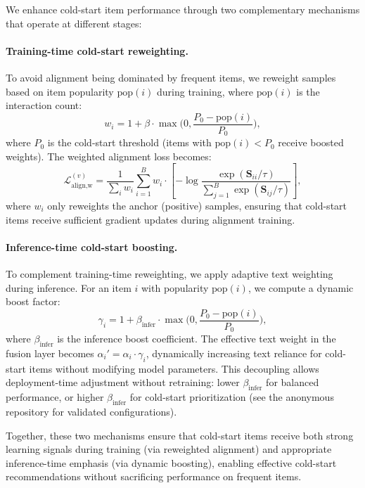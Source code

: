 \documentclass[sigconf,natbib=true,anonymous]{acmart}
\begin{document}
We enhance cold-start item performance through two complementary
mechanisms that operate at different stages:

\paragraph{Training-time cold-start reweighting.}
To avoid alignment being dominated by frequent items, we
reweight samples based on item popularity $\mathrm{pop}(i)$
during training, where $\mathrm{pop}(i)$ is the interaction count:
\begin{equation}
  w_i = 1 + \beta\cdot \max\Big(0, \frac{P_0-\mathrm{pop}(i)}{P_0}\Big),
\end{equation}
where $P_0$ is the cold-start threshold (items with $\mathrm{pop}(i) < P_0$
receive boosted weights). The weighted alignment loss becomes:
\begin{equation}
  \mathcal{L}_{\text{align,w}}^{(v)} =
  \frac{1}{\sum_i w_i}\sum_{i=1}^{B} w_i \cdot
  \left[-\log \frac{\exp(\mathbf{S}_{ii}/\tau)}{\sum_{j=1}^{B}\exp(\mathbf{S}_{ij}/\tau)}\right],
\end{equation}
where $w_i$ only reweights the anchor (positive) samples, ensuring
that cold-start items receive sufficient gradient updates during
alignment training.

\paragraph{Inference-time cold-start boosting.}
To complement training-time reweighting, we apply adaptive text
weighting during inference. For an item $i$ with popularity
$\mathrm{pop}(i)$, we compute a dynamic boost factor:
\begin{equation}
  \gamma_i = 1 + \beta_{\text{infer}} \cdot \max\Big(0, 
  \frac{P_0-\mathrm{pop}(i)}{P_0}\Big),
  \label{eq:infer_boost}
\end{equation}
where $\beta_{\text{infer}}$ is the inference boost coefficient.
The effective text weight in the fusion layer becomes 
$\alpha_i' = \alpha_i \cdot \gamma_i$, dynamically increasing text
reliance for cold-start items without modifying model parameters.
This decoupling allows deployment-time adjustment without
retraining: lower $\beta_{\text{infer}}$ for balanced performance,
or higher $\beta_{\text{infer}}$ for cold-start prioritization
(see the anonymous repository for validated configurations).

Together, these two mechanisms ensure that cold-start items receive
both strong learning signals during training (via reweighted
alignment) and appropriate inference-time emphasis (via dynamic
boosting), enabling effective cold-start recommendations without
sacrificing performance on frequent items.
\end{document}
